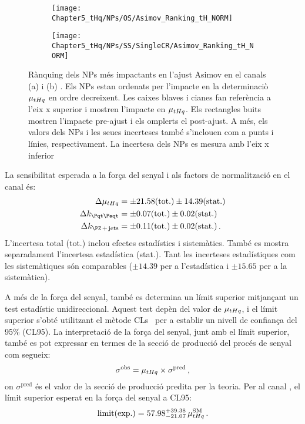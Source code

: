 \begin{figure}[h]
\centering
\begin{subfigure}{.5\textwidth}
  \centering
  \texttt{[image: Chapter5\_tHq/NPs/OS/Asimov\_Ranking\_tH\_NORM]}
  \caption{}
\end{subfigure}%
\hfill
\begin{subfigure}{.5\textwidth}
  \centering
  \texttt{[image: Chapter5\_tHq/NPs/SS/SingleCR/Asimov\_Ranking\_tH\_NORM]}
  \caption{}
\end{subfigure}%
\caption{Rànquing dels NPs més impactants en l'ajust Asimov en el canals (a) \dilepOStau i (b) \dilepSStau. 
Els NPs estan ordenats per l'impacte en la determinaciò $\mu_{tHq}$ en ordre decreixent. 
Les caixes blaves i cianes fan referència a l'eix x superior i mostren l'impacte en $\mu_{tHq}$. 
Els rectangles buits mostren l'impacte pre-ajust i els omplerts el post-ajust.
 A més, els valors dels NPs i les seues incerteses també s'inclouen com a punts i línies, respectivament. 
 La incertesa dels NPs es mesura amb l'eix x inferior} 
\label{fig:resum:ASIMOV:rank}
\end{figure}



La sensibilitat esperada a la força del senyal i als factors de normalització en el canal \dilepOStau és:
\begin{align}
	\Delta \mu_{\tHq} 	&= \pm 21.58 (\text{tot.}) \pm 14.39 (\text{stat.}) \label{eq:resum:ASIMOV:OS:POIs:mu} \\
	\Delta k_{\ttbar} 	&= \pm 0.07 (\text{tot.}) \pm 0.02 (\text{stat.}) \label{eq:resum:ASIMOV:OS:POIs:ktt} \\
	\Delta k_{\Zjets} 	&= \pm 0.11 (\text{tot.}) \pm 0.02 (\text{stat.}) \label{eq:resum:ASIMOV:OS:POIs:kzj} \, .
\end{align}
L'incertesa total (tot.) inclou efectes estadístics i sistemàtics.
També es mostra separadament l'incertesa estadística (stat.).
Tant les incerteses estadístiques com les sistemàtiques són comparables
($\pm14.39$ per a l'estadística i $\pm15.65$ per a la sistemàtica).

A més de la força del senyal, també es determina un límit superior mitjançant un test estadístic unidireccional.
Aquest test depèn del valor de $\mu_{tHq}$, i el límit superior s'obté utilitzant el mètode CLs~\cite{Read:2002hq} per a establir un nivell de confiança del 95\% (CL95). La interpretació de la força del senyal,
junt amb el límit superior, també es pot expressar en termes de la secció de producció del procés de senyal com segueix:
\begin{equation*}
\sigma^{\text{obs}} = \mu_{tHq} \times \sigma^{\text{pred}} \, ,
\end{equation*}
on $\sigma^{\text{pred}}$ és el valor de la secció de producció predita per la teoria.
Per al canal \dilepOStau, el límit superior esperat en la força del senyal a CL95:
\begin{equation*}
\text{limit(exp.)} = 57.98^{+39.38}_{-21.07} \, \mu^{\text{SM}}_{tHq}\, .
\end{equation*}


